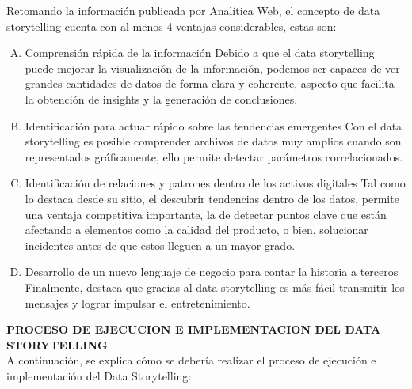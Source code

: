 \documentclass[preprint,12pt]{elsarticle}
\begin{document}
	Retomando la información publicada por Analítica Web, el concepto de data storytelling cuenta con al menos 4 ventajas considerables, estas son: 
	
	\begin{enumerate}[A.)]
		\item Comprensión rápida de la información
		Debido a que el data storytelling puede mejorar la visualización de la información, podemos ser capaces de ver grandes cantidades de datos de forma clara y coherente, aspecto que facilita la obtención de insights y la generación de conclusiones.
		\\
		\item Identificación para actuar rápido sobre las tendencias emergentes
		Con el data storytelling es posible comprender archivos de datos muy amplios cuando son representados gráficamente, ello permite detectar parámetros correlacionados.
		\\
		\item Identificación de relaciones y patrones dentro de los activos digitales
		Tal como lo destaca desde su sitio, el descubrir tendencias dentro de los datos, permite una ventaja competitiva importante, la de detectar puntos clave que están afectando a elementos como la calidad del producto, o bien, solucionar incidentes antes de que estos lleguen a un mayor grado.
		\\
		\item Desarrollo de un nuevo lenguaje de negocio para contar la historia a terceros
		Finalmente, destaca que gracias al data storytelling es más fácil transmitir los mensajes y lograr impulsar el entretenimiento.
		
	\end{enumerate}
	
	\textbf{PROCESO DE EJECUCION E IMPLEMENTACION DEL DATA STORYTELLING}\\
	
	A continuación, se explica cómo se debería realizar el proceso de ejecución e implementación del Data Storytelling:
	
\end{document}
